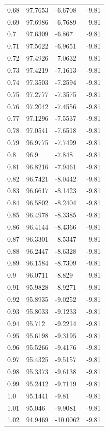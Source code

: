 \begin{tabular}{llll}
0.68 & 97.7653 & -6.6708 & -9.81 \\
0.69 & 97.6986 & -6.7689 & -9.81 \\
0.7 & 97.6309 & -6.867 & -9.81 \\
0.71 & 97.5622 & -6.9651 & -9.81 \\
0.72 & 97.4926 & -7.0632 & -9.81 \\
0.73 & 97.4219 & -7.1613 & -9.81 \\
0.74 & 97.3503 & -7.2594 & -9.81 \\
0.75 & 97.2777 & -7.3575 & -9.81 \\
0.76 & 97.2042 & -7.4556 & -9.81 \\
0.77 & 97.1296 & -7.5537 & -9.81 \\
0.78 & 97.0541 & -7.6518 & -9.81 \\
0.79 & 96.9775 & -7.7499 & -9.81 \\
0.8 & 96.9 & -7.848 & -9.81 \\
0.81 & 96.8216 & -7.9461 & -9.81 \\
0.82 & 96.7421 & -8.0442 & -9.81 \\
0.83 & 96.6617 & -8.1423 & -9.81 \\
0.84 & 96.5802 & -8.2404 & -9.81 \\
0.85 & 96.4978 & -8.3385 & -9.81 \\
0.86 & 96.4144 & -8.4366 & -9.81 \\
0.87 & 96.3301 & -8.5347 & -9.81 \\
0.88 & 96.2447 & -8.6328 & -9.81 \\
0.89 & 96.1584 & -8.7309 & -9.81 \\
0.9 & 96.0711 & -8.829 & -9.81 \\
0.91 & 95.9828 & -8.9271 & -9.81 \\
0.92 & 95.8935 & -9.0252 & -9.81 \\
0.93 & 95.8033 & -9.1233 & -9.81 \\
0.94 & 95.712 & -9.2214 & -9.81 \\
0.95 & 95.6198 & -9.3195 & -9.81 \\
0.96 & 95.5266 & -9.4176 & -9.81 \\
0.97 & 95.4325 & -9.5157 & -9.81 \\
0.98 & 95.3373 & -9.6138 & -9.81 \\
0.99 & 95.2412 & -9.7119 & -9.81 \\
1.0 & 95.1441 & -9.81 & -9.81 \\
1.01 & 95.046 & -9.9081 & -9.81 \\
1.02 & 94.9469 & -10.0062 & -9.81 \\

\end{tabular}
